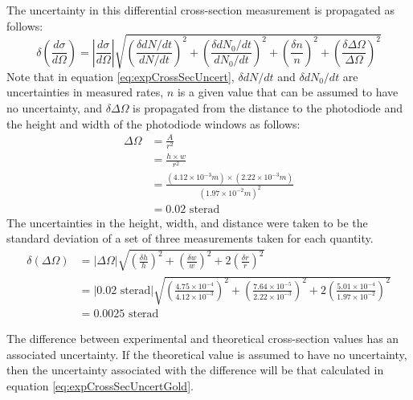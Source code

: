\documentclass[a4paper]{article}
\begin{document}
The uncertainty in this differential cross-section measurement is propagated as follows:
\begin{equation} \label{eq:expCrossSecUncert}
 \delta \left( \frac{d \sigma}{d \Omega} \right)
   = \left\lvert \frac{d \sigma}{d \Omega} \right\rvert
   \sqrt
   {
        \left( \frac{\delta dN/dt}{dN/dt} \right) ^2
        +
        \left( \frac{\delta dN_0/dt}{dN_0/dt} \right) ^2
        +
        \left( \frac{\delta n}{n} \right) ^2
        +
        \left( \frac{\delta \Delta \Omega}{\Delta \Omega} \right) ^2
   }
\end{equation}
Note that in equation \ref{eq:expCrossSecUncert}, $\delta dN/dt$ and $\delta dN_0/dt$ are uncertainties in measured rates, $n$ is a given value that can be assumed to have no uncertainty, and $\delta \Delta \Omega$ is propagated from the distance to the photodiode and the height and width of the photodiode windows as follows:
\begin{align*}
\Delta \Omega &= \frac{A}{r^2} \\
              &= \frac{h \times w}{r^2} \\
              &= \frac{(4.12 \times 10^{-3}m) \times (2.22 \times 10^{-3}m)}{(1.97 \times 10^{-2} m)^2} \\
              &= 0.02 \text{ sterad}
\end{align*}
The uncertainties in the height, width, and distance were taken to be the standard deviation of a set of three measurements taken for each quantity.
\begin{align*}
 \delta \left( \Delta \Omega  \right)
   &= | \Delta \Omega |
   \sqrt{
        \left( \frac{\delta h}{h} \right) ^2
        +
         \left( \frac{\delta w}{w} \right) ^2
        + 2 \left( \frac{\delta r}{r} \right) ^2
   } \\
   &= | 0.02 \text{ sterad} |
   \sqrt{
        \left( \frac{4.75 \times 10^{-4}}{4.12 \times 10^{-3}} \right) ^2
        +
         \left( \frac{7.64 \times 10^{-5}}{2.22 \times 10^{-3}} \right) ^2
        + 2 \left( \frac{5.01 \times 10^{-4}}{1.97 \times 10^{-2}} \right) ^2
   } \\
   &= 0.0025 \text{ sterad}
\end{align*}

The difference between experimental and theoretical cross-section values has an associated uncertainty. If the theoretical value is assumed to have no uncertainty, then the uncertainty associated with the difference will be that calculated in equation \ref{eq:expCrossSecUncertGold}.
\end{document}
